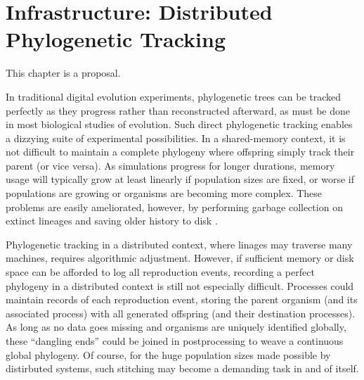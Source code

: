 \chapter{Infrastructure: Distributed Phylogenetic Tracking}
\label{ch:distributed-phylogeny}

\noindent
This chapter is a proposal.

In traditional digital evolution experiments, phylogenetic trees can be tracked perfectly as they progress \citep{bohm2017mabe,wang2018vine,lalejini2019data} rather than reconstructed afterward, as must be done in most biological studies of evolution.
Such direct phylogenetic tracking enables a dizzying suite of experimental possibilities.
In a shared-memory context, it is not difficult to maintain a complete phylogeny where offspring simply track their parent (or vice versa).
As simulations progress for longer durations, memory usage will typically grow at least linearly if population sizes are fixed, or worse if populations are growing or organisms are becoming more complex.
These problems are easily ameliorated, however, by performing garbage collection on extinct lineages and saving older history to disk \citep{bohm2017mabe,dolson2019modes}.

Phylogenetic tracking in a distributed context, where linages may traverse many machines, requires algorithmic adjustment.
However, if sufficient memory or disk space can be afforded to log all reproduction events, recording a perfect phylogeny in a distributed context is still not especially difficult.
Processes could maintain records of each reproduction event, storing the parent organism (and its associated process) with all generated offspring (and their destination processes).
As long as no data goes missing and organisms are uniquely identified globally, these ``dangling ends'' could be joined in postprocessing to weave a continuous global phylogeny.
Of course, for the huge population sizes made possible by distirbuted systems, such stitching may become a demanding task in and of itself.


